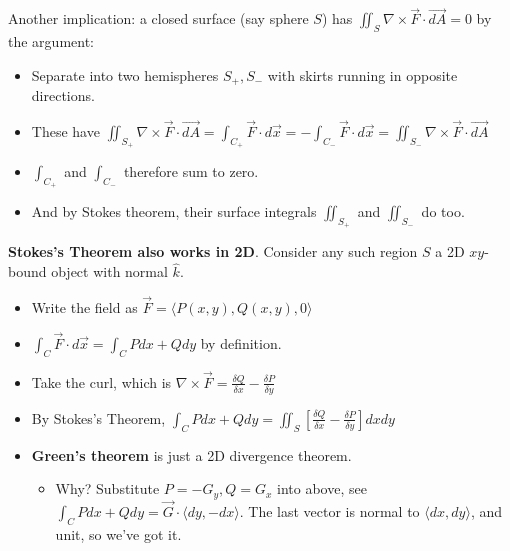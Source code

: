 \documentclass[11pt, oneside]{article}   	%
\begin{document}
Another implication: a closed surface (say sphere $S$) has $ \iint_S \nabla \times \vec{F} \cdot \vec{dA}  = 0$ by the argument:
\begin{itemize}
\item Separate into two hemispheres $S_+, S_-$ with skirts running in opposite directions.
\item These have $\iint_{S_+}  \nabla \times \vec{F} \cdot \vec{dA} = \int_{C_+} \vec{F}\cdot d\vec{x} = - \int_{C_-} \vec{F}\cdot d\vec{x} = \iint_{S_-} \nabla \times \vec{F} \cdot \vec{dA}$
\item $\int_{C_+}$ and $\int_{C_-}$ therefore sum to zero.
\item And by Stokes theorem, their surface integrals $\iint_{S_+}$ and $\iint_{S_-}$ do too.
\end{itemize}

\textbf{Stokes's Theorem also works in 2D}.  Consider any such region $S$ a 2D $xy$-bound object with normal $\hat{k}$. 
\begin{itemize}
\item Write the field as $\vec{F} = \langle P(x,y), Q(x,y), 0 \rangle$
\item $\int_C \vec{F} \cdot d\vec{x} = \int_C P dx + Qdy$ by definition.
\item Take the curl, which is $\nabla \times \vec{F} = \frac{\delta Q}{\delta x} -  \frac{\delta P}{\delta y}$
\item By Stokes's Theorem, $ \int_C P dx + Qdy = \iint_S [\frac{\delta Q}{\delta x} -  \frac{\delta P}{\delta y}]dxdy$
\item \textbf{Green's theorem}  is just a 2D divergence theorem.
\begin{itemize}
\item Why? Substitute $P = -G_y, Q = G_x$ into above, see $\int_C P dx + Q dy = \vec{G} \cdot \langle dy, -dx \rangle$.  The last vector is normal to $\langle dx, dy \rangle$, and unit, so we've got it. 
\end{itemize}
\end{itemize}
\end{document}
